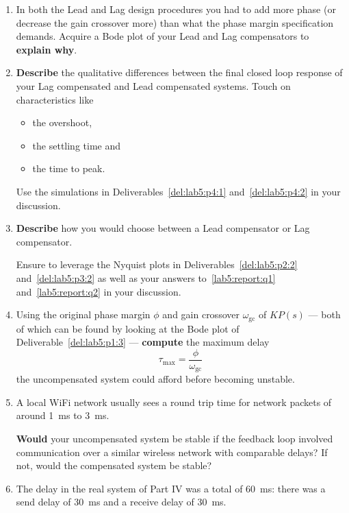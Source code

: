 \begin{deliverable}[label={lab5:report}]
  \begin{enumerate}[label={(\arabic*)}]
    \item{%
      In both the Lead and Lag design procedures you had to add more phase (or decrease the gain crossover more) than what the phase margin specification demands.
      Acquire a Bode plot of your Lead and Lag compensators to \textbf{explain why}.
      \label{lab5:report:q1}
    }
    \item{%
      \textbf{Describe} the qualitative differences between the final closed loop response of your Lag compensated and Lead compensated systems.
      Touch on characteristics like
      \begin{itemize}
        \item{
          the overshoot,
        }
        \item{
          the settling time and
        }
        \item{
          the time to peak.
        }
      \end{itemize}
      Use the simulations in Deliverables~\ref{del:lab5:p4:1} and~\ref{del:lab5:p4:2} in your discussion.
      \label{lab5:report:q2}
    }
    \item{%
      \textbf{Describe} how you would choose between a Lead compensator or Lag compensator.

      Ensure to leverage the Nyquist plots in Deliverables~\ref{del:lab5:p2:2} and~\ref{del:lab5:p3:2} as well as your answers to~\ref{lab5:report:q1} and~\ref{lab5:report:q2} in your discussion.

      \label{lab5:report:q3}
    }
    \item{%
      Using the original phase margin \(\phi\) and gain crossover \(\omega_\mathrm{gc}\) of \(K P(s)\) --- both of which can be found by looking at the Bode plot of Deliverable~\ref{del:lab5:p1:3} --- \textbf{compute} the maximum delay
      \[
        \tau_\mathrm{max} = \frac{\phi}{\omega_\mathrm{gc}}
      \]
      the uncompensated system could afford before becoming unstable.
      \label{lab5:report:q4}
    }
    \item{%
      A local WiFi network usually sees a round trip time for network packets of around \SI{1}{\milli\second} to \SI{3}{\milli\second}.

      \textbf{Would} your uncompensated system be stable if the feedback loop involved communication over a similar wireless network with comparable delays?
      If not, would the compensated system be stable?
      \label{lab5:report:q5}
    }
    \item{%
      The delay in the real system of Part IV was a total of \SI{60}{\milli\second}:
      there was a send delay of \SI{30}{\milli\second} and a receive delay of \SI{30}{\milli\second}.

}
\end{enumerate}
\end{deliverable}
